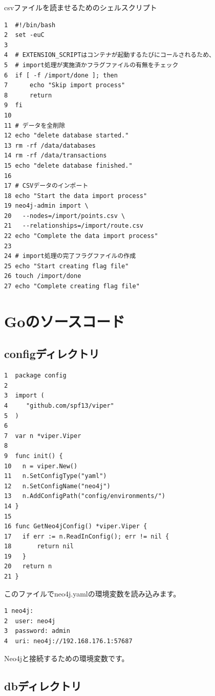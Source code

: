 csvファイルを読ませるためのシェルスクリプト
\begin{tcolorbox}[title=import\_data.sh]
\begin{verbatim}
1  #!/bin/bash
2  set -euC
3
4  # EXTENSION_SCRIPTはコンテナが起動するたびにコールされるため、
5  # import処理が実施済かフラグファイルの有無をチェック
6  if [ -f /import/done ]; then
7      echo "Skip import process"
8      return
9  fi
10
11 # データを全削除
12 echo "delete database started."
13 rm -rf /data/databases
14 rm -rf /data/transactions
15 echo "delete database finished."
16
17 # CSVデータのインポート
18 echo "Start the data import process"
19 neo4j-admin import \
20   --nodes=/import/points.csv \
21   --relationships=/import/route.csv
22 echo "Complete the data import process"
23
24 # import処理の完了フラグファイルの作成
25 echo "Start creating flag file"
26 touch /import/done
27 echo "Complete creating flag file"
\end{verbatim}
\end{tcolorbox}
    
\section{Goのソースコード}
\subsection{configディレクトリ}

\begin{tcolorbox}[title=config.go]
\begin{verbatim}
1  package config
2
3  import (
4  	  "github.com/spf13/viper"
5  )
6
7  var n *viper.Viper
8
9  func init() {
10 	 n = viper.New()
11	 n.SetConfigType("yaml")
12 	 n.SetConfigName("neo4j")
13 	 n.AddConfigPath("config/environments/")
14 }
15
16 func GetNeo4jConfig() *viper.Viper {
17	 if err := n.ReadInConfig(); err != nil {
18		 return nil
19	 }
20	 return n
21 }
\end{verbatim}
\end{tcolorbox}
このファイルでneo4j.yamlの環境変数を読み込みます。
\begin{tcolorbox}[title=neo4j.yml]
\begin{verbatim}
1 neo4j:
2  user: neo4j
3  password: admin
4  uri: neo4j://192.168.176.1:57687
\end{verbatim}
\end{tcolorbox}
Neo4jと接続するための環境変数です。
\subsection{dbディレクトリ}

